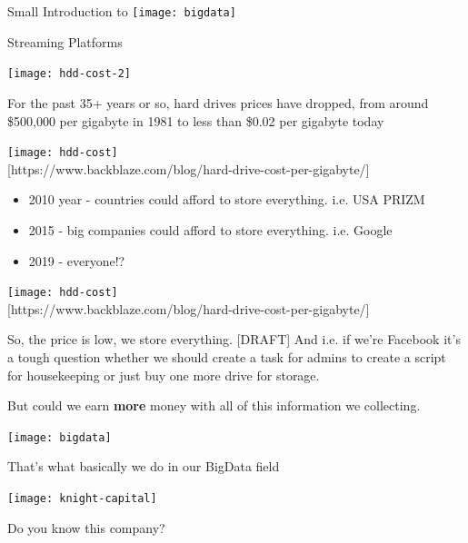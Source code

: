 \documentclass[aspectratio=169, 15pt,usenames,dvipsnames]{beamer}
\begin{document}
\begin{gdsw}
	\LARGE\centering Small Introduction to
	\centering\texttt{[image: bigdata]}
	\par
	Streaming Platforms
\end{gdsw}
\begin{gdsw}
	\centering\texttt{[image: hdd-cost-2]} 
	\par
	For the past 35+ years or so, hard drives prices have dropped, from around \$500,000 per gigabyte in 1981 to less than \$0.02 per gigabyte today
\end{gdsw}
\begin{gdsw}
	\centering\texttt{[image: hdd-cost]}\\
	\centering\tiny [https://www.backblaze.com/blog/hard-drive-cost-per-gigabyte/]
	\par\normalsize\centering\begin{itemize}
	\item 2010 year - countries could afford to store everything. i.e. USA PRIZM
	\item 2015 - big companies could afford to store everything. i.e. Google
	\item 2019 - everyone!?
	\end{itemize}
\end{gdsw}
\begin{gdsw}
	\centering\texttt{[image: hdd-cost]}\\
	\centering\tiny [https://www.backblaze.com/blog/hard-drive-cost-per-gigabyte/]
	\par\Large
	So, the price is low, we store everything. 
	[DRAFT]
	And i.e. if we're Facebook it's a tough question whether we should create a task for admins to create a script for housekeeping or just buy one more drive for storage.
\end{gdsw}
\begin{gdsw}
	\par\centering\Large
	But could we earn {\bf more} money with all of this information we collecting.\\        
\end{gdsw}
\begin{gdsw}
	\centering\texttt{[image: bigdata]}
	\par
	That's what basically we do in our BigData field
\end{gdsw}	
\begin{gdsw}
	\centering\texttt{[image: knight-capital]}
	\par\LARGE
	Do you know this company? 
\end{gdsw}
\end{document}
